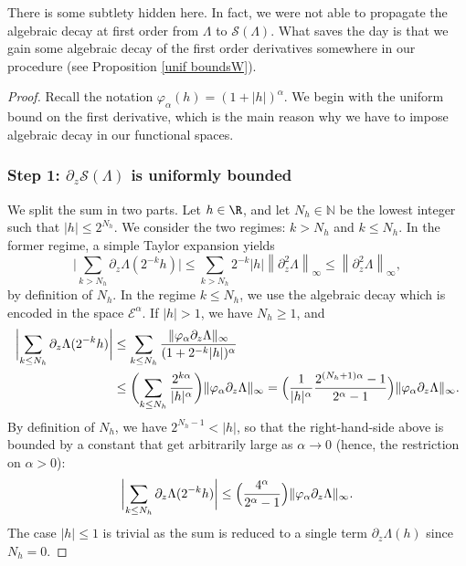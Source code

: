 \documentclass[10pt]{amsart}
\let\mathcal\mathscr
\newcommand{\cS}{\mathcal{S}}
\theoremstyle{plain}
\theoremstyle{definition}
\newcommand{\N}{\mathbb{N}}
\let\ds\displaystyle
\newcommand{\abs}[1]{\left\lvert#1\right\rvert}
\newcommand{\bbabs}[1]{\biggl\lvert#1\biggr\rvert}
\newcommand{\Ea}{\mathcal{E}^\alpha}
\newcommand{\vphia}{\varphi_\alpha}
\begin{document}
There is some subtlety hidden here. In fact, we were not able to propagate the algebraic decay at first order from $\Lambda$ to $\cS(\Lambda)$. What saves the day is that we gain some algebraic decay of the first order derivatives somewhere in our procedure (see \eg Proposition \ref{unif boundsW}).

\begin{proof}
Recall the notation $\vphia (h)= (1 + \abs{h})^\alpha$. We begin with the uniform bound on the first derivative, which is the main reason why we have to impose algebraic decay in our functional spaces.

\subsubsection*{Step 1: $ \partial_z \cS(\Lambda)$ is uniformly bounded}
We split the sum in two parts. Let $h \in \R$, and let $N_h \in \N$ be the lowest integer such that $|h| \leq 2^{N_h}$.
We consider the two regimes: $k> N_h$ and $k \leq N_h$. In the former regime, a simple Taylor expansion yields
\begin{equation*}
\ds \bbabs{\sum_{k > N_h} \partial_z \Lambda (2^{-k}h)} \leq \ds \sum_{k > N_h} 2^{-k}| h | \left \|\partial_z^2 \Lambda \right \|_{\infty} \leq \left \|\partial_z^2 \Lambda \right \|_{\infty},
\end{equation*}
by definition of $N_h$.
In the regime $k \leq N_h $, we use the algebraic decay which is encoded in the space $\Ea$. If $|h|>1$, we have $N_h\geq 1$, and
\begin{align*}
\biggl | \sum_{k\leq N_h} \partial_z \Lambda (2^{-k}h)\biggr| &\leq \sum_{k\leq N_h } \frac{\|\vphia \partial_z \Lambda \|_{\infty}} {(1+2^{-k}|h|)^\alpha}\\
&\leq \biggl (\sum_{k\leq N_h } \dfrac{2^{k \alpha}}{|h|^\alpha} \biggr) \|\vphia \partial_z \Lambda \|_{\infty} = \Bigl (\dfrac{1}{|h|^\alpha} \dfrac{2^{(N_h+1) \alpha }-1}{2^\alpha-1} \Bigr) \|\vphia \partial_z \Lambda \|_{\infty}.
\end{align*}
By definition of $N_h$, we have $2^{N_h-1} < |h|$, so that the right-hand-side above is bounded by a constant that get arbitrarily large as $\alpha\to 0$ (hence, the restriction on $\alpha>0$):
\begin{equation}\label{eq:alpha collapses}
\bbabs{ \sum_{k\leq N_h} \partial_z \Lambda (2^{-k}h) } \leq \Bigl (\dfrac{4^\alpha}{2^\alpha - 1} \Bigr) \|\vphia \partial_z \Lambda \|_{\infty}.
\end{equation}
The case $|h|\leq 1$ is trivial as the sum is reduced to a single term $\partial_z \Lambda (h)$ since $N_h = 0$.


\end{proof}
\end{document}
